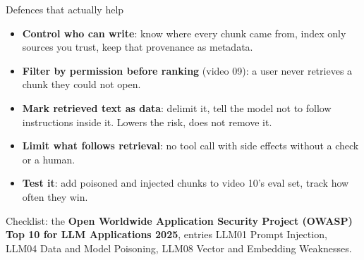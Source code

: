 \begin{frame}{Defences that actually help}
  \small
  \begin{itemize}\setlength{\itemsep}{1pt}
    \item \textbf{Control who can write}: know where every chunk came from, index only sources you
      trust, keep that provenance as metadata.
    \item \textbf{Filter by permission before ranking} (video 09): a user never retrieves a chunk
      they could not open.
    \item \textbf{Mark retrieved text as data}: delimit it, tell the model not to follow
      instructions inside it. Lowers the risk, does not remove it.
    \item \textbf{Limit what follows retrieval}: no tool call with side effects without a check or a
      human.
    \item \textbf{Test it}: add poisoned and injected chunks to video 10's eval set, track how often
      they win.
  \end{itemize}

  \vspace{0.1em}
  {\footnotesize Checklist: the \textbf{Open Worldwide Application Security Project (OWASP) Top 10 for
  LLM Applications 2025}, entries LLM01 Prompt Injection, LLM04 Data and Model Poisoning, LLM08
  Vector and Embedding Weaknesses.}

  \vspace{0.1em}
\end{frame}

